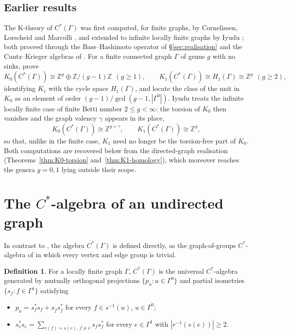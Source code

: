 \documentclass[12pt,reqno]{amsart}
\theoremstyle{plain}
\theoremstyle{definition}
\newtheorem{definition}[theorem]{Definition}
\newcommand{\Z}{\mathbb{Z}}
\begin{document}
\subsection*{Earlier results} The K-theory of $C^*(\Gamma)$ was first computed, for finite graphs, by
Cornelissen, Lorscheid and Marcolli \cite{CLM}, and extended to infinite locally finite graphs by
Iyudu \cite{Iyudu}; both proceed through the Bass--Hashimoto operator of \S\ref{sec:realisation} and the Cuntz--Krieger algebras of \cite{CK}. For
a finite connected graph $\Gamma$ of genus $g$ with no sinks, \cite{CLM} prove
\[
K_0(C^*(\Gamma))\cong\Z^{g}\oplus\Z/(g-1)\Z\ \ (g\ge 1),\qquad
K_1(C^*(\Gamma))\cong H_1(\Gamma)\cong\Z^{g}\ \ (g\ge 2),
\]
identifying $K_1$ with the cycle space $H_1(\Gamma)$, and locate the class of the unit in $K_0$ as an
element of order $(g-1)/\gcd(g-1,|\Gamma^0|)$. Iyudu \cite{Iyudu} treats the infinite locally finite
case of finite Betti number $2\le g<\infty$: the torsion of $K_0$ then vanishes and the graph valency $\gamma$ appears in its place,
\[
K_0(C^*(\Gamma))\cong\Z^{g+\gamma},\qquad K_1(C^*(\Gamma))\cong\Z^{g},
\]
so that, unlike in the finite case, $K_1$ need no longer be the torsion-free part of $K_0$. Both
computations are recovered below from the directed-graph realisation
(Theorems~\ref{thm:K0-torsion} and~\ref{thm:K1-homology}), which moreover reaches the genera
$g=0,1$ lying outside their scope.

\section{The $C^*$-algebra of an undirected graph}\label{sec:algebra}

In contrast to \cite{CLM,Iyudu}, the algebra $C^*(\Gamma)$ is defined directly, as the graph-of-groups $C^*$-algebra of
\cite{BMPST} in which every vertex and edge group is trivial.

\begin{definition}\label{def:CG}
For a locally finite graph $\Gamma$, $C^*(\Gamma)$ is the universal $C^*$-algebra generated by
mutually orthogonal projections $\{p_u:u\in\Gamma^0\}$ and partial isometries $\{s_f:f\in\Gamma^1\}$
satisfying
\begin{itemize}
\item[(R1)] $p_u=s_f^{*}s_f+s_{\bar f}s_{\bar f}^{*}$ for every $f\in s^{-1}(u)$, $u\in\Gamma^0$;
\item[(R2)] $\displaystyle s_e^{*}s_e=\!\!\sum_{r(f)=s(e),\,f\neq\bar e}\!\! s_fs_f^{*}$ for every
$e\in\Gamma^1$ with $|r^{-1}(s(e))|\ge 2$.
\end{itemize}
\end{definition}
\end{document}
